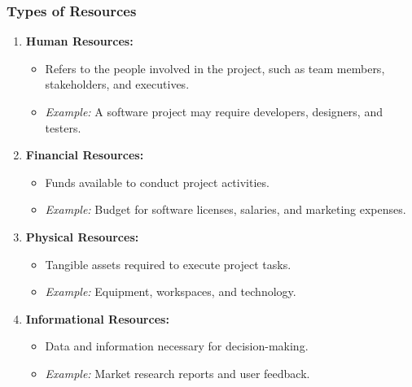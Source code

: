 \documentclass[aspectratio=169]{beamer}
\begin{document}
\begin{frame}[fragile]
    \frametitle{Types of Resources}
    \begin{enumerate}
        \item \textbf{Human Resources:}
            \begin{itemize}
                \item Refers to the people involved in the project, such as team members, stakeholders, and executives.
                \item \textit{Example:} A software project may require developers, designers, and testers.
            \end{itemize}
    
        \item \textbf{Financial Resources:}
            \begin{itemize}
                \item Funds available to conduct project activities.
                \item \textit{Example:} Budget for software licenses, salaries, and marketing expenses.
            \end{itemize}
    
        \item \textbf{Physical Resources:}
            \begin{itemize}
                \item Tangible assets required to execute project tasks.
                \item \textit{Example:} Equipment, workspaces, and technology.
            \end{itemize}
    
        \item \textbf{Informational Resources:}
            \begin{itemize}
                \item Data and information necessary for decision-making.
                \item \textit{Example:} Market research reports and user feedback.
            \end{itemize}
    \end{enumerate}
\end{frame}
\end{document}
